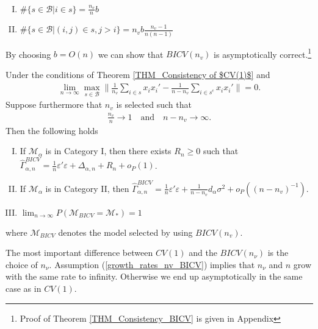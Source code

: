 \documentclass[Research_Module_ES.tex]{subfiles}
\begin{document}
\begin{claim}~
	\label{Claim_BICV}
	\begin{enumerate}[(I)]
	\item $\#\{s\in \mathcal{B}| i\in s\} = \frac{n_v}{n} b$ 
	\item $\#\{s\in\mathcal{B}|(i,j)\in s, j>i\}=n_vb\frac{n_v-1}{n(n-1)}$
	\end{enumerate}
\end{claim}
By choosing $b=O(n)$ we can show that $BICV(n_v)$ is asymptotically correct.\footnote{Proof of Theorem \ref{THM_Consistency_BICV} is given in Appendix }
\begin{thm}
	\label{THM_Consistency_BICV}
Under the conditions of Theorem \ref{THM_Consistency of $CV(1)$} and
\begin{align}
\lim_{n\to\infty} \max_{s\in \mathcal{B}}\biggl\lVert \frac{1}{n_v}\sum_{i\in s}x_ix_i' - \frac{1}{n-n_v}\sum_{i\in s^c}x_ix_i'\biggr\rVert =0. \label{gram_matrix_condition_BICV}
\end{align}
Suppose furthermore that $n_v$ is selected such that
\begin{align}
\frac{n_v}{n}\to 1 \quad \textrm{and} \quad n-n_v \to \infty. \label{growth_rates_nv_BICV}
\end{align}
Then the following holds
\begin{enumerate}[(I)]
\item If $\mathcal{M}_\alpha$ is in Category I, then there exists $R_n \ge 0$ such that $\hat{\Gamma}_{\alpha,n}^{BICV} = \frac{1}{n}\varepsilon'\varepsilon + \Delta_{\alpha,n} + R_n + o_P(1)$.
\item If $\mathcal{M}_\alpha$ is in Category II, then $\hat{\Gamma}_{\alpha,n}^{BICV} = \frac{1}{n}\varepsilon'\varepsilon + \frac{1}{n-n_v}d_\alpha\sigma^2  + o_P((n-n_v)^{-1})$.
\item $\lim_{n\to\infty}P(\mathcal{M}_{BICV}=\mathcal{M}_\ast) = 1$
\end{enumerate}
where $\mathcal{M}_{BICV}$ denotes the model selected by using $BICV(n_v)$.
\end{thm}
The most important difference between $CV(1)$ and the $BICV(n_\nu)$ is the choice of $n_\nu$. Assumption (\ref{growth_rates_nv_BICV}) implies that $n_\nu$ and $n$ grow with the same rate to infinity. Otherwise we end up asymptotically in the same case as in $CV(1)$.\\
\end{document}
